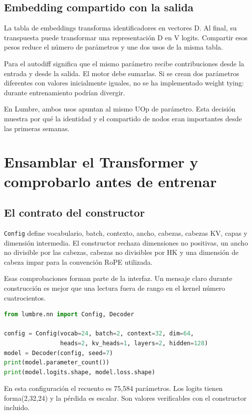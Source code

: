 \documentclass[12pt,a4paper,oneside]{report}
\begin{document}
\section{Embedding compartido con la salida}
La tabla de embeddings transforma identificadores en vectores D. Al final, su transpuesta puede transformar una representación D en V logits. Compartir esos pesos reduce el número de parámetros y une dos usos de la misma tabla.

Para el autodiff significa que el mismo parámetro recibe contribuciones desde la entrada y desde la salida. El motor debe sumarlas. Si se crean dos parámetros diferentes con valores inicialmente iguales, no se ha implementado weight tying: durante entrenamiento podrían divergir.

En Lumbre, ambos usos apuntan al mismo UOp de parámetro. Esta decisión muestra por qué la identidad y el compartido de nodos eran importantes desde las primeras semanas.

\chapter{Ensamblar el Transformer y comprobarlo antes de entrenar}
\label{ch:decoder-completo}
\section{El contrato del constructor}
\texttt{Config} define vocabulario, batch, contexto, ancho, cabezas, cabezas KV, capas y dimensión intermedia. El constructor rechaza dimensiones no positivas, un ancho no divisible por las cabezas, cabezas no divisibles por HK y una dimensión de cabeza impar para la convención RoPE utilizada.

Esas comprobaciones forman parte de la interfaz. Un mensaje claro durante construcción es mejor que una lectura fuera de rango en el kernel número cuatrocientos.

\begin{lstlisting}[language=Python]
from lumbre.nn import Config, Decoder

config = Config(vocab=24, batch=2, context=32, dim=64,
                heads=2, kv_heads=1, layers=2, hidden=128)
model = Decoder(config, seed=7)
print(model.parameter_count())
print(model.logits.shape, model.loss.shape)
\end{lstlisting}
En esta configuración el recuento es 75,584 parámetros. Los logits tienen forma(2,32,24) y la pérdida es escalar. Son valores verificables con el constructor incluido.
\end{document}
